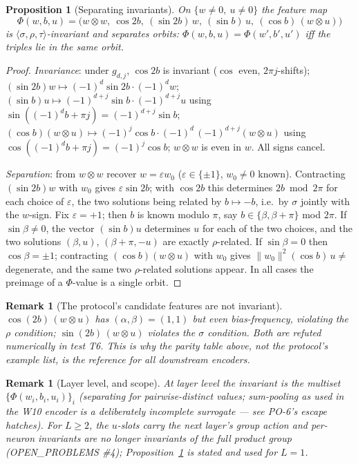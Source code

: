\documentclass[11pt]{article}
\newtheorem{proposition}[theorem]{Proposition}
\newtheorem{remark}[theorem]{Remark}
\begin{document}
\begin{proposition}[Separating invariants]\label{prop:po4}
On $\{w\ne0,\ u\ne0\}$ the feature map
\[
\Phi(w,b,u)=\Big(w\otimes w,\ \cos 2b,\ (\sin 2b)\,w,\ (\sin b)\,u,\ (\cos b)\,(w\otimes u)\Big)
\]
is $\langle\sigma,\rho,\tau\rangle$-invariant and separates orbits: $\Phi(w,b,u)=\Phi(w',b',u')$
iff the triples lie in the same orbit.
\end{proposition}

\begin{proof}
\emph{Invariance}: under $g_{d,j}$, $\cos 2b$ is invariant ($\cos$ even, $2\pi j$-shifts);
$(\sin 2b)w\mapsto(-1)^d\sin 2b\cdot(-1)^d w$; $(\sin b)u\mapsto(-1)^{d+j}\sin b\cdot(-1)^{d+j}u$
using $\sin((-1)^db+\pi j)=(-1)^{d+j}\sin b$; $(\cos b)(w\otimes u)\mapsto
(-1)^{j}\cos b\cdot(-1)^{d}\,(-1)^{d+j}(w\otimes u)$ using $\cos((-1)^db+\pi j)=(-1)^j\cos b$;
$w\otimes w$ is even in $w$. All signs cancel.

\emph{Separation}: from $w\otimes w$ recover $w=\varepsilon w_0$ ($\varepsilon\in\{\pm1\}$,
$w_0\neq0$ known). Contracting $(\sin 2b)w$ with $w_0$ gives $\varepsilon\sin 2b$; with $\cos 2b$
this determines $2b \bmod 2\pi$ for each choice of $\varepsilon$, the two solutions being related
by $b\mapsto-b$, i.e.\ by $\sigma$ jointly with the $w$-sign. Fix $\varepsilon=+1$; then $b$ is
known modulo $\pi$, say $b\in\{\beta,\beta+\pi\}$ mod $2\pi$. If $\sin\beta\ne0$, the vector
$(\sin b)u$ determines $u$ for each of the two choices, and the two solutions
$(\beta,u)$, $(\beta+\pi,-u)$ are exactly $\rho$-related. If $\sin\beta=0$ then $\cos\beta=\pm1$;
contracting $(\cos b)(w\otimes u)$ with $w_0$ gives $\|w_0\|^2(\cos b)\,u\neq$ degenerate, and the
same two $\rho$-related solutions appear. In all cases the preimage of a $\Phi$-value is a single
orbit. \qedhere
\end{proof}

\begin{remark}[The protocol's candidate features are not invariant]
$\cos(2b)\,(w\otimes u)$ has $(\alpha,\beta)=(1,1)$ but even bias-frequency, violating the $\rho$
condition; $\sin(2b)\,(w\otimes u)$ violates the $\sigma$ condition. Both are refuted numerically
in test T6. This is why the parity table above, not the protocol's example list, is the reference
for all downstream encoders.
\end{remark}

\begin{remark}[Layer level, and scope]
At layer level the invariant is the \emph{multiset} $\{\Phi(w_i,b_i,u_i)\}_i$ (separating for
pairwise-distinct values; sum-pooling as used in the W10 encoder is a deliberately incomplete
surrogate — see PO-6's escape hatches). For $L\ge2$, the $u$-slots carry the next layer's group
action and per-neuron invariants are no longer invariants of the full product group
(OPEN\_PROBLEMS \#4); Proposition~\ref{prop:po4} is stated and used for $L=1$.
\end{remark}
\end{document}
